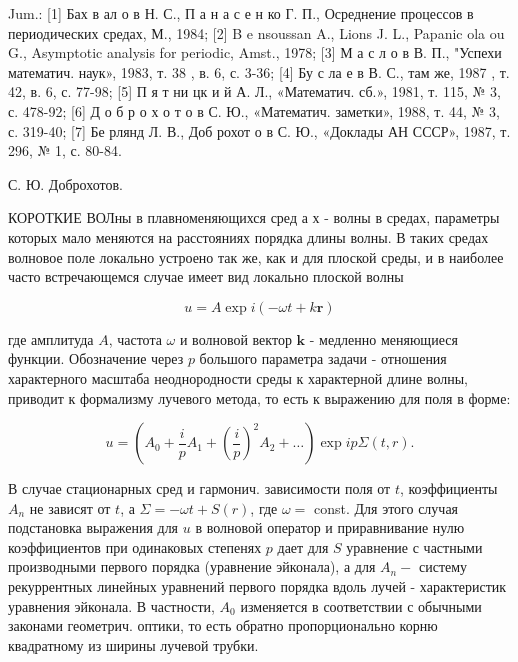 \documentclass[10pt]{article}
\begin{document}
Jum.: [1] Бах в ал о в Н. С., П а н а с е н ко Г. П., Осреднение процессов в периодических средах, М., 1984; [2] B e nsoussan A., Lions J. L., Papanic ola ou G., Asymptotic analysis for periodic, Amst., 1978; [3] М а с л о в В. П., "Успехи математич. наук», 1983, т. 38 , в. 6, с. 3-36; [4] Бу с ла е в В. С., там же, 1987 , т. 42, в. 6, с. 77-98; [5] П я т ни цк и й А. Л., «Математич. сб.», 1981, т. 115, № 3, с. 478-92; [6] Д о б р о х о т о в С. Ю., «Математич. заметки», 1988, т. 44, № 3, с. 319-40; [7] Бе рлянд Л. В., Доб рохот о в С. Ю., «Доклады АН СССР», 1987, т. 296, № 1, с. 80-84.



С. Ю. Доброхотов.



КОРОТКИЕ ВОЛны в плавноменяющихся сред а х - волны в средах, параметры которых мало меняются на расстояниях порядка длины волны. В таких средах волновое поле локально устроено так же, как и для плоской среды, и в наиболее часто встречающемся случае имеет вид локально плоской волны



\[

u=A \exp i(-\omega t+k \boldsymbol{r})

\]



где амплитуда $A$, частота $\omega$ и волновой вектор $\boldsymbol{k}$ - медленно меняющиеся функции. Обозначение через $p$ большого параметра задачи - отношения характерного масштаба неоднородности среды к характерной длине волны, приводит к формализму лучевого метода, то есть к выражению для поля в форме:



\[

u=\left(A_{0}+\frac{i}{p} A_{1}+\left(\frac{i}{p}\right)^{2} A_{2}+\ldots\right) \exp i p \Sigma(t, r) .

\]



В случае стационарных сред и гармонич. зависимости поля от $t$, коэффициенты $A_{n}$ не зависят от $t$, а $\Sigma=-\omega t+S(r)$, где $\omega=$ const. Для этого случая подстановка выражения для $u$ в волновой оператор и приравнивание нулю коэффициентов при одинаковых степенях $p$ дает для $S$ уравнение с частными производными первого порядка (уравнение эйконала), а для $A_{n}-$ систему рекуррентных линейных уравнений первого порядка вдоль лучей - характеристик уравнения эйконала. В частности, $A_{0}$ изменяется в соответствии с обычными законами геометрич. оптики, то есть обратно пропорционально корню квадратному из ширины лучевой трубки.
\end{document}
